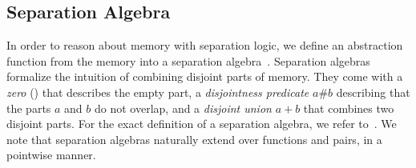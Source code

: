 \documentclass[a4paper,UKenglish,cleveref, autoref, thm-restate]{lipics-v2021}
\begin{document}


  \subsection{Separation Algebra}
  In order to reason about memory with separation logic, we define an abstraction function from the memory into a separation algebra~\cite{CHY07}.
  Separation algebras formalize the intuition of combining disjoint parts of memory.
  They come with a \emph{zero} () that describes the empty part, a \emph{disjointness predicate} $a\#b$
  describing that the parts $a$ and $b$ do not overlap, and a \emph{disjoint union} $a+b$ that combines two disjoint parts.
  For the exact definition of a separation algebra, we refer to~\cite{CHY07,KKB12}. We note that
  separation algebras naturally extend over functions and pairs, in a pointwise manner.

%
%
\end{document}
